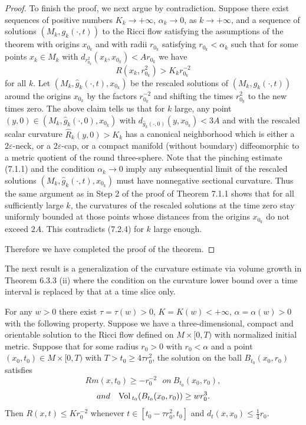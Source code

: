 \begin{proof}
To finish the proof, we next argue by contradiction. Suppose there
exist sequences of positive numbers $K_k\rightarrow+\infty$,
$\alpha_k\rightarrow0$, as $k\rightarrow+\infty$, and a sequence
of solutions $(M_k,g_k(\cdot,t))$ to the Ricci flow satisfying the
assumptions of the theorem with origins $x_{0_k}$ and with radii
$r_{0_k}$ satisfying $r_{0_k}<\alpha_k$ such that for some points
$x_k\in M_k$ with $d_{r^2_{0_k}}(x_k,x_{0_k})<Ar_{0_k}$ we have
\begin{equation}
R(x_k,r^2_{0_k})>K_kr^{-2}_{0_k} %
\end{equation} for all $k$. Let $(M_k,\hat{g}_k(\cdot,t),x_{0_k})$ be the
rescaled solutions of $(M_k,g_k(\cdot,t))$ around the origins
$x_{0_k}$ by the factors $r^{-2}_{0_k}$ and shifting the times
$r^2_{0_k}$ to the new times zero. The above claim tells us that
for $k$ large, any point $(y,0) \in
(M_k,\hat{g}_k(\cdot,0),x_{0_k})$ with
$d_{\hat{g}_k(\cdot,0)}(y,x_{0_k}) < 3A$ and with the rescaled
scalar curvature $\hat{R}_k(y,0) > K_k$ has a canonical
neighborhood which is either a $2\varepsilon$-neck, or a
$2\varepsilon$-cap, or a compact manifold (without boundary)
diffeomorphic to a metric quotient of the round three-sphere. Note
that the pinching estimate (7.1.1) and the condition
$\alpha_k\rightarrow0$ imply any subsequential limit of the
rescaled solutions $(M_k,\hat{g}_k(\cdot,t),x_{0_k})$ must have
nonnegative sectional curvature. Thus the same argument as in Step
2 of the proof of Theorem 7.1.1 shows that for all sufficiently
large $k$, the curvatures of the rescaled solutions at the time
zero stay uniformly bounded at those points whose distances from
the origins $x_{0_k}$ do not exceed $2A$. This contradicts (7.2.4)
for $k$ large enough.

Therefore we have completed the proof of the theorem.
\end{proof}

The next result is a generalization of the curvature estimate via
volume growth in Theorem 6.3.3 (ii) where the condition on the
curvature lower bound over a time interval is replaced by that at
a time slice only.

\begin{theorem}
  \label{thm:cz-lower-volume-ratio-curvature-control}

For any $w>0$ there exist $\tau=\tau(w)>0$, $K=K(w)<+\infty$,
$\alpha=\alpha(w)>0$ with the following property. Suppose we have
a three-dimensional, compact and orientable solution to the Ricci
flow defined on $M\times[0,T)$ with normalized initial metric.
Suppose that for some radius $r_0>0$ with $r_0<\alpha$ and a point
$(x_0,t_0)\in M\times[0,T)$ with $T
> t_0\geq4\tau r^2_0$, the solution on the ball $B_{t_0}(x_0,r_0)$
satisfies
$$
Rm(x,t_0)\geq-r_0^{-2}\ \ \ on\ B_{t_0}(x_0,r_0),
$$
$$
and\ \ \ {\rm Vol}\,_{t_0}(B_{t_0}(x_0,r_0))\geq wr_0^3.
$$
Then $R(x,t)\leq Kr_0^{-2}$ whenever $t\in[t_0-\tau r^2_0,t_0]$
and $d_t(x,x_0)\leq\frac{1}{4}r_0.$
\end{theorem}

